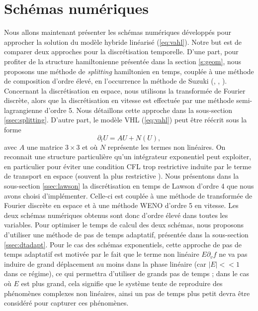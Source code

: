 
\section{Schémas numériques}
\label{s:scheme}

Nous allons maintenant présenter les schémas numériques développés pour approcher la solution du modèle hybride linéarisé (\ref{eq:vahl}). Notre but est de comparer deux approches pour la discrétisation temporelle. D'une part, pour profiter de la structure hamiltonienne présentée dans la section \ref{s:geom}, nous proposons une méthode de \emph{splitting} hamiltonien en temps, couplée à une méthode de composition d'ordre élevé, en l’occurrence la méthode de Suzuki (\cite{Suzuki:1990}, \cite{Hairer:2006}, \cite{Blanes:2019}). Concernant la discrétisation en espace, nous utilisons la transformée de Fourier discrète, alors que la discrétisation en vitesse est effectuée par une méthode semi-lagrangienne d'ordre 5. Nous détaillons cette approche dans la sous-section \ref{ssec:splitting}. D'autre part, le modèle VHL (\ref{eq:vahl}) peut être réécrit sous la forme 
$$
  \partial_t U = AU + N(U), 
$$
avec $A$ une matrice $3\times 3$ et où $N$ représente les termes non linéaires. On reconnait une structure particulière qu'un intégrateur exponentiel peut exploiter, en particulier pour éviter une condition CFL trop restrictive induite par le terme de transport en espace (souvent la plus restrictive \cite{Crouseilles:2019b}). Nous présentons dans la sous-section \ref{ssec:lawson} la discrétisation en temps de Lawson d'ordre 4 que nous avons choisi d'implémenter. Celle-ci est couplée à une méthode de transformée de Fourier discrète en espace et à une méthode WENO d'ordre 5 en vitesse. Les deux schémas numériques obtenus sont donc d'ordre élevé dans toutes les variables. Pour optimiser le temps de calcul des deux schémas, nous proposons d'utiliser une méthode de pas de temps adaptatif, présentée dans la sous-section \ref{ssec:dtadapt}. Pour le cas des schémas exponentiels, cette approche de pas de temps adaptatif est motivée par le fait que le terme non linéaire $E\partial_v f$ ne va pas induire de grand déplacement au moins dans la phase linéaire (car $|E|<\!\!< 1$ dans ce régime), ce qui permettra d'utiliser de grands pas de temps ; dans le cas où $E$ est plus grand, cela signifie que le système tente de reproduire des phénomènes complexes non linéaires, ainsi un pas de temps plus petit devra être considéré pour capturer ces  phénomènes. 


